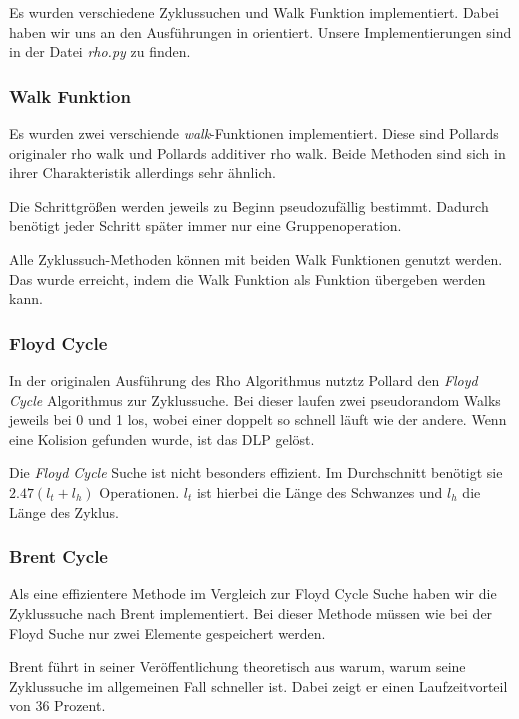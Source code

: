 \documentclass{scrartcl}
\begin{document}
Es wurden verschiedene Zyklussuchen und Walk Funktion
implementiert.
Dabei haben wir uns an den Ausführungen in \cite{Galbraith2012}
orientiert.
Unsere Implementierungen sind in der Datei \emph{rho.py} zu finden.

\subsubsection{Walk Funktion}
\label{sec:walk_funktion}
Es wurden zwei verschiende \emph{walk}-Funktionen implementiert.
Diese sind Pollards originaler rho walk und Pollards additiver rho walk.
Beide Methoden sind sich in ihrer Charakteristik allerdings sehr ähnlich.

Die Schrittgrößen werden jeweils zu Beginn pseudozufällig bestimmt.
Dadurch benötigt jeder Schritt später immer nur eine Gruppenoperation.

Alle Zyklussuch-Methoden können mit beiden Walk Funktionen genutzt werden.
Das wurde erreicht, indem die Walk Funktion als Funktion übergeben werden kann.

\subsubsection{Floyd Cycle}
\label{sec:floyd_cycle}
In der originalen Ausführung des Rho Algorithmus nutztz Pollard
den \emph{Floyd Cycle} Algorithmus zur Zyklussuche.
Bei dieser laufen zwei pseudorandom Walks jeweils bei 0 und 1 los,
wobei einer doppelt so schnell läuft wie der andere.
Wenn eine Kolision gefunden wurde, ist das DLP gelöst.

Die \emph{Floyd Cycle} Suche ist nicht besonders effizient.
Im Durchschnitt benötigt sie \( 2.47(l_t + l_h) \) Operationen.
\( l_t \) ist hierbei die Länge des Schwanzes und \( l_h \) die
Länge des Zyklus.
\cite{Galbraith2012}

\subsubsection{Brent Cycle}
\label{sec:brent_cycle}
Als eine effizientere Methode im Vergleich zur Floyd Cycle Suche
haben wir die Zyklussuche nach Brent \cite{Brent1980} implementiert.
Bei dieser Methode müssen wie bei der Floyd Suche nur zwei Elemente gespeichert werden.
\cite{Galbraith2012}

Brent führt in seiner Veröffentlichung theoretisch aus warum, warum seine
Zyklussuche im allgemeinen Fall schneller ist.
Dabei zeigt er einen Laufzeitvorteil von 36 Prozent.
\cite{Brent1980}
\end{document}
